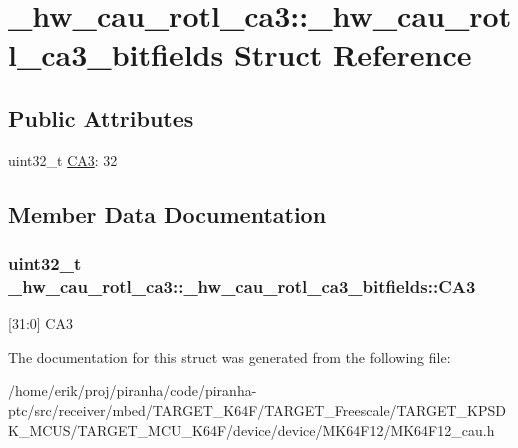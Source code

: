 \hypertarget{struct__hw__cau__rotl__ca3_1_1__hw__cau__rotl__ca3__bitfields}{}\section{\+\_\+hw\+\_\+cau\+\_\+rotl\+\_\+ca3\+:\+:\+\_\+hw\+\_\+cau\+\_\+rotl\+\_\+ca3\+\_\+bitfields Struct Reference}
\label{struct__hw__cau__rotl__ca3_1_1__hw__cau__rotl__ca3__bitfields}
\subsection*{Public Attributes}
\begin{DoxyCompactItemize}
\item 
uint32\+\_\+t \hyperlink{struct__hw__cau__rotl__ca3_1_1__hw__cau__rotl__ca3__bitfields_ad579d9b718dd1088ab0f6848e8291c32}{C\+A3}\+: 32
\end{DoxyCompactItemize}


\subsection{Member Data Documentation}
\subsubsection[{\texorpdfstring{C\+A3}{CA3}}]{\setlength{\rightskip}{0pt plus 5cm}uint32\+\_\+t \+\_\+hw\+\_\+cau\+\_\+rotl\+\_\+ca3\+::\+\_\+hw\+\_\+cau\+\_\+rotl\+\_\+ca3\+\_\+bitfields\+::\+C\+A3}\hypertarget{struct__hw__cau__rotl__ca3_1_1__hw__cau__rotl__ca3__bitfields_ad579d9b718dd1088ab0f6848e8291c32}{}\label{struct__hw__cau__rotl__ca3_1_1__hw__cau__rotl__ca3__bitfields_ad579d9b718dd1088ab0f6848e8291c32}
\mbox{[}31\+:0\mbox{]} C\+A3 

The documentation for this struct was generated from the following file\+:\begin{DoxyCompactItemize}
\item 
/home/erik/proj/piranha/code/piranha-\/ptc/src/receiver/mbed/\+T\+A\+R\+G\+E\+T\+\_\+\+K64\+F/\+T\+A\+R\+G\+E\+T\+\_\+\+Freescale/\+T\+A\+R\+G\+E\+T\+\_\+\+K\+P\+S\+D\+K\+\_\+\+M\+C\+U\+S/\+T\+A\+R\+G\+E\+T\+\_\+\+M\+C\+U\+\_\+\+K64\+F/device/device/\+M\+K64\+F12/M\+K64\+F12\+\_\+cau.\+h\end{DoxyCompactItemize}
